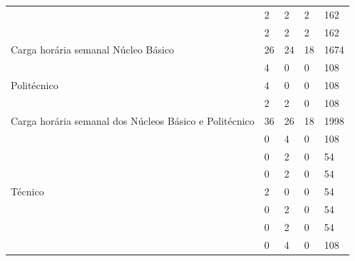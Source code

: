 \documentclass[11pt,fleqn]{book} %
\begin{document}
\begin{table}[H]
{\begin{tabular}{|l|l|l|l|l|l|}
			& \nameref{disc:filosofia}                                                     & 2          & 2         & 2         & 162       \\ \cline{2-6} 
			& \nameref{disc:sociologia}                                                    & 2          & 2         & 2         & 162       \\ \hline
			\multicolumn{2}{|l|}{Carga horária semanal Núcleo Básico}                      & 26         & 24        & 18        & 1674      \\ \hline
			\multirow{3}{*}{Politécnico}   
			& \nameref{disc:quimica}                                                       & 4          & 0         & 0         & 108       \\ \cline{2-6} 
			& \nameref{disc:biologia}                                                      & 4          & 0         & 0         & 108       \\ \cline{2-6} 	
			& \nameref{disc:pratica}                                                       & 2          & 2         & 0         & 108       \\ \hline	
			\multicolumn{2}{|l|}{Carga horária semanal dos Núcleos Básico  e Politécnico}  & 36         & 26        & 18        & 1998      \\ \hline
			\multirow{12}{*}{Técnico}       
			& \nameref{disc:biomol}                                                        & 0          & 4         & 0         & 108       \\ \cline{2-6} 
			& \nameref{disc:bioquimica}                                                    & 0          & 2         & 0         & 54        \\ \cline{2-6} 
			& \nameref{disc:bioetica}                                                      & 0          & 2         & 0         & 54        \\ \cline{2-6} 		
			& \nameref{disc:bioseg}                                                        & 2          & 0         & 0         & 54        \\ \cline{2-6} 
			& \nameref{disc:biotecAnimal}                                                  & 0          & 2         & 0         & 54        \\ \cline{2-6} 
			& \nameref{disc:biotecVegetal}                                                 & 0          & 2         & 0         & 54        \\ \cline{2-6} 
			& \nameref{disc:analitica}                                                     & 0          & 4         & 0         & 108       \\ \cline{2-6}

\end{tabular}}
\end{table}
\end{document}
